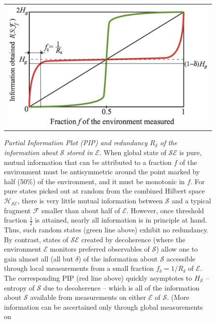 \documentclass[aps,rmp,epsfig,11pt]{revtex4}
\def\FCW{0.98\columnwidth}
\newcommand{\cH}        {{\mathcal H}}
\newcommand{\cS}        {{\mathcal S}}
\newcommand{\cE}        {{\mathcal E}}
\newcommand{\+}         {\dagger}
\newcommand\cF{{\mathcal F}}
\begin{document}
\begin{figure}[tb]
\begin{tabular}{l}
\vspace{-0.15in} \includegraphics[width=\FCW]{pips1B.pdf}\\
\end{tabular}
\caption{\emph{Partial Information Plot (PIP) and redundancy $R_\delta$ of the information 
about $\cS$ stored in $\cE$}.  When global state of $\cS\cE$ is pure, mutual information that can be 
attributed to a fraction $f$ of the environment must be antisymmetric around the point marked by half 
(50\%) of the environment, and it must be monotonic in $f$. For pure states picked out at random from 
the combined Hilbert space $\cH_{\cS\cE}$, there is very little mutual information between $\cS$ and 
a typical fragment $\cF$ smaller than about half of $\cE$. However, once threshold fraction $\frac 1 2$ 
is attained, nearly all information is in principle at hand. Thus, such random states (green line above)
exhibit no redundancy. By contrast, states of $\cS\cE$ created by decoherence (where the environment $\cE$ monitors preferred observables of $\cS$) allow one to gain almost all (all but $\delta$) of the information about $\cS$ accessible through local measurements from a small fraction $f_\delta=1/R_\delta$ of $\cE$. The corresponding PIP (red line above) quickly asymptotes to $H_\cS$ -- entropy 
of $\cS$ due to decoherence -- which is all of the information about $\cS$ available from measurements
on either $\cE$ of $\cS$. (More information can be ascertained only through global measurements on 
}
\end{figure}
\end{document}
